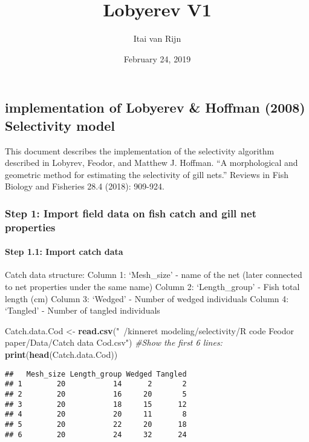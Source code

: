 \documentclass[]{article}
\title{Lobyerev V1}
\author{Itai van Rijn}
\date{February 24, 2019}
\newenvironment{Shaded}{\begin{snugshade}}{\end{snugshade}}
\newcommand{\KeywordTok}[1]{\textcolor[rgb]{0.13,0.29,0.53}{\textbf{#1}}}
\newcommand{\StringTok}[1]{\textcolor[rgb]{0.31,0.60,0.02}{#1}}
\newcommand{\CommentTok}[1]{\textcolor[rgb]{0.56,0.35,0.01}{\textit{#1}}}
\newcommand{\NormalTok}[1]{#1}
\let\oldparagraph\paragraph
\renewcommand{\paragraph}[1]{\oldparagraph{#1}\mbox{}}
\begin{document}
\maketitle

\subsection{implementation of Lobyerev \& Hoffman (2008) Selectivity
model}\label{implementation-of-lobyerev-hoffman-2008-selectivity-model}

This document describes the implementation of the selectivity algorithm
described in Lobyrev, Feodor, and Matthew J. Hoffman. ``A morphological
and geometric method for estimating the selectivity of gill nets.''
Reviews in Fish Biology and Fisheries 28.4 (2018): 909-924.

\subsubsection{Step 1: Import field data on fish catch and gill net
properties}\label{step-1-import-field-data-on-fish-catch-and-gill-net-properties}

\paragraph{Step 1.1: Import catch
data}\label{step-1.1-import-catch-data}

Catch data structure: Column 1: `Mesh\_size' - name of the net (later
connected to net properties under the same name) Column 2:
`Length\_group' - Fish total length (cm) Column 3: `Wedged' - Number of
wedged individuals Column 4: `Tangled' - Number of tangled individuals

\begin{Shaded}
\begin{Highlighting}[]
\NormalTok{Catch.data.Cod <-}\StringTok{ }\KeywordTok{read.csv}\NormalTok{(}\StringTok{"~/kinneret modeling/selectivity/R code Feodor paper/Data/Catch data Cod.csv"}\NormalTok{)}
\CommentTok{#Show the first 6 lines:}
\KeywordTok{print}\NormalTok{(}\KeywordTok{head}\NormalTok{(Catch.data.Cod))}
\end{Highlighting}
\end{Shaded}

\begin{verbatim}
##   Mesh_size Length_group Wedged Tangled
## 1        20           14      2       2
## 2        20           16     20       5
## 3        20           18     15      12
## 4        20           20     11       8
## 5        20           22     20      18
## 6        20           24     32      24
\end{verbatim}
\end{document}

